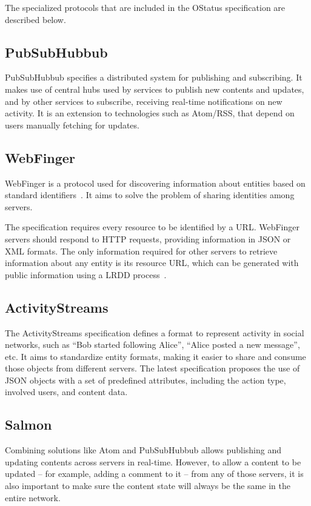 The specialized protocols that are included in the OStatus specification
are described below.


\subsection{PubSubHubbub}

PubSubHubbub specifies a distributed system for publishing and
subscribing. It makes use of central hubs used by services to publish
new contents and updates, and by other services to subscribe, receiving
real-time notifications on new activity. It is an extension to
technologies such as Atom/RSS, that depend on users manually fetching
for updates.

\subsection{WebFinger}

WebFinger is a protocol used for discovering information about entities
based on standard identifiers~\cite{rfc7033}. It aims to solve the problem
of sharing identities among servers.

The specification requires every resource to be identified by a URL.
WebFinger servers should respond to HTTP requests, providing information
in JSON or XML formats. The only information required for other servers
to retrieve information about any entity is its resource URL, which can
be generated with public information using a LRDD process~\cite{lrdd2010}.

\subsection{ActivityStreams}

The ActivityStreams specification defines a format to represent activity
in social networks, such as ``Bob started following Alice'', ``Alice
posted a new message'', etc. It aims to standardize entity formats,
making it easier to share and consume those objects from different
servers. The latest specification proposes the use of JSON objects
with a set of predefined attributes, including the action type, involved
users, and content data.

\subsection{Salmon}

Combining solutions like Atom and PubSubHubbub allows publishing and
updating contents across servers in real-time. However, to allow a
content to be updated -- for example, adding a comment to it -- from any
of those servers, it is also important to make sure the content state
will always be the same in the entire network.

